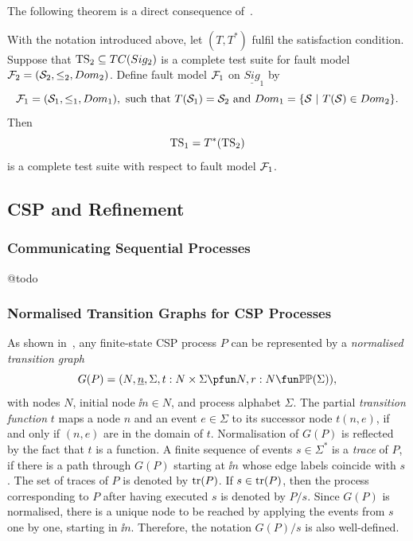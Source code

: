 
 The following theorem is a direct consequence of~\cite[Theorem~2.1]{Huang2017}.

\begin{theorem}\label{th:theorytranslation}
With the notation introduced above, let  $(T,T^*)$ fulfil the satisfaction condition.
Suppose that ${\text{TS}}_2 \subseteq TC(Sig_2)$ is a complete test suite
for fault model ${\cal F}_2 = ({\cal S}_2,\le_2,Dom_2)$. Define fault model ${\cal F}_1$ on
$\underline{Sig}_1$ by
$$
{\cal F}_1 = ({\cal S}_1,\le_1,Dom_1),\ \text{such that}\
T({\cal S}_1)  =  {\cal S}_2\ \text{and}\
Dom_1  =  \{ {\cal S}~|~T({\cal S})\in Dom_2 \}.
$$
Then
$$
{\text{TS}}_1 = T^*({\text{TS}}_2)
$$
is a complete test suite with respect to fault model ${\cal F}_1$.
\xbox
\end{theorem}





\subsection{CSP and Refinement}

\subsubsection*{Communicating Sequential Processes} @todo

\subsubsection*{Normalised Transition Graphs for CSP Processes}
\label{sec:ntg}

As shown in~\cite{Roscoe:1994:CME:197600}, any finite-state CSP process $P$ can be represented by a \emph{normalised transition graph}
$$
G(P) = ( N, \ii n, \Sigma, t : N\times\Sigma \pfun N, r : N \fun \mathbb{P}\mathbb{P}(\Sigma)),
$$
with nodes $N$, initial node $\ii n\in N$, and process alphabet $\Sigma$. The partial \emph{transition function} $t$ maps a node $n$ and an event $e\in\Sigma$ to its successor node $t(n,e)$, if and only if $(n,e)$ are in the domain of $t$. Normalisation of $G(P)$ is reflected
by the fact that $t$ is a function. A finite sequence of events $s\in\Sigma^*$
is a \emph{trace} of $P$, if there is a path through $G(P)$ starting  at $\ii n$ whose edge labels coincide
with $s$. The set of traces of $P$ is denoted by $\text{tr}(P)$. If $s\in\text{tr}(P)$, then the process corresponding to $P$ after having executed $s$ is denoted by $P/s$. Since
$G(P)$ is normalised, there is a unique node to be  reached by applying the events from
$s$ one by one, starting in $\ii n$. Therefore, the notation $G(P)/s$  is also well-defined.


